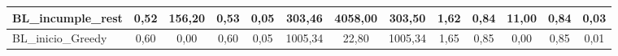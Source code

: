 \documentclass[12pt, spanish]{article}
\begin{document}
\begin{table}[H]
\begin{adjustwidth}{-2cm}{-2cm}
\begin{tabular}{|l|c|c|c|c|c|c|c|c|c|c|c|c|}
BL\_incumple\_rest                                      & 0,52                         & 156,20                         & 0,53                      & 0,05                   & 303,46                       & 4058,00                        & 303,50                    & 1,62                   & 0,84                         & 11,00                          & 0,84                      & 0,03                   \\ \hline
BL\_inicio\_Greedy                                      & 0,60                         & 0,00                           & 0,60                      & 0,05                   & 1005,34                      & 22,80                          & 1005,34                   & 1,65                   & 0,85                         & 0,00                           & 0,85                      & 0,01                   \\ \hline
\end{tabular}
\end{adjustwidth}
\end{table}
\end{document}
